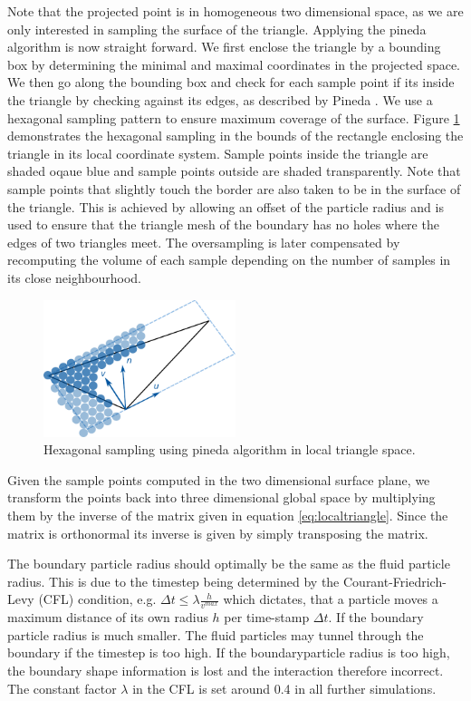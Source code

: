 \documentclass[11pt, letterpaper, twocolumn]{article}
\begin{document}
Note that the projected point is in homogeneous two dimensional space, as we are only interested in sampling the surface of the triangle. Applying the pineda algorithm is now straight forward. We first enclose the triangle by a bounding box by determining the minimal and maximal coordinates in the projected space. We then go along the bounding box and check for each sample point if its inside the triangle by checking against its edges, as described by Pineda \cite{pineda1988}. We use a hexagonal sampling pattern to ensure maximum coverage of the surface. Figure \ref{fig:trianglesampling} demonstrates the hexagonal sampling in the bounds of the rectangle enclosing the triangle in its local coordinate system. Sample points inside the triangle are shaded oqaue blue and sample points outside are shaded transparently. Note that sample points that slightly touch the border are also taken to be in the surface of the triangle. This is achieved by allowing an offset of the particle radius and is used to ensure that the triangle mesh of the boundary has no holes where the edges of two triangles meet. The oversampling is later compensated by recomputing the volume of each sample depending on the number of samples in its close neighbourhood.

\begin{figure}[ht]
    \centering
    \includegraphics[width=0.5\textwidth]{images/triangle.pdf}
    \caption{Hexagonal sampling using pineda algorithm in local triangle space.}
    \label{fig:trianglesampling}
\end{figure}

Given the sample points computed in the two dimensional surface plane, we transform the points back into three dimensional global space by multiplying them by the inverse of the matrix given in equation \ref{eq:localtriangle}. Since the matrix is orthonormal its inverse is given by simply transposing the matrix.


The boundary particle radius should optimally be the same as the fluid particle radius. This is due to the timestep being determined by the Courant-Friedrich-Levy (CFL) condition, e.g. \( \Delta t \leq \lambda \frac{h}{v^{max}}\) which dictates, that a particle moves a maximum distance of its own radius \(h\) per time-stamp \(\Delta t \). If the boundary particle radius is much smaller. The fluid particles may tunnel through the boundary if the timestep is too high. If the boundaryparticle radius is too high, the boundary shape information is lost and the interaction therefore incorrect. The constant factor \(\lambda\) in the CFL is set around 0.4 in all further simulations.
\end{document}
